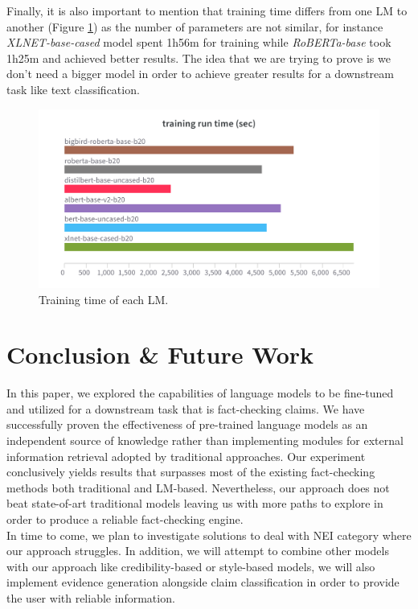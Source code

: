 \documentclass[conference]{IEEEtran}
\begin{document}
Finally, it is also important to mention that training time differs from one LM to another (Figure \ref{fig:train_time}) as the number of parameters are not similar, for instance \textit{XLNET-base-cased} model spent 1h56m for training while \textit{RoBERTa-base} took 1h25m and achieved better results. The idea that we are trying to prove is we don't need a bigger model in order to achieve greater results for a downstream task like text classification.

\begin{figure}[htp]
    \centering
    \includegraphics[scale=0.13]{train_time.png}
    \caption[Comparison]{Training time of each LM.}
    \label{fig:train_time}
\end{figure}

\section{Conclusion \& Future Work}
In this paper, we explored the capabilities of language models to be fine-tuned and utilized for a downstream task that is fact-checking claims. We have successfully proven the effectiveness of pre-trained language models as an independent source of knowledge rather than implementing modules for external information retrieval adopted by traditional approaches. Our experiment conclusively yields results that surpasses most of the existing fact-checking methods both traditional and LM-based. Nevertheless, our approach does not beat state-of-art traditional models leaving us with more paths to explore in order to produce a reliable fact-checking engine.\\

In time to come, we plan to investigate solutions to deal with NEI category where our approach struggles. In addition, we will attempt to combine other models with our approach like credibility-based or style-based models, we will also implement evidence generation alongside claim classification in order to provide the user with reliable information.  
\end{document}
